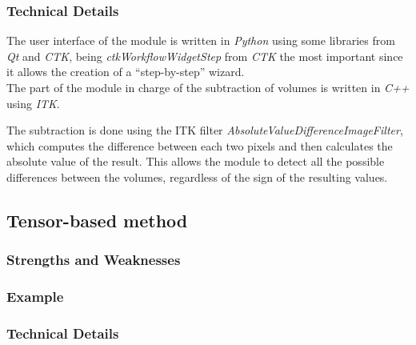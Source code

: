 \subsubsection{Technical Details}
The user interface of the module is written in \textit{Python} using
some libraries from \textit{Qt} and \textit{CTK}, being
\textit{ctkWorkflowWidgetStep} from \textit{CTK} the most important
since it allows the creation of a ``step-by-step'' wizard.\\


The part of the module in charge of the subtraction of volumes is
written in \textit{C++} using \textit{ITK}.

The subtraction is done using the ITK filter
\textit{AbsoluteValueDifferenceImageFilter}, which computes the
difference between each two pixels and then calculates the absolute
value of the result. This allows the module to detect all the possible
differences between the volumes, regardless of the sign of the
resulting values.\\


\subsection{Tensor-based method}



\subsubsection{Strengths and Weaknesses}

\subsubsection{Example}


\subsubsection{Technical Details}